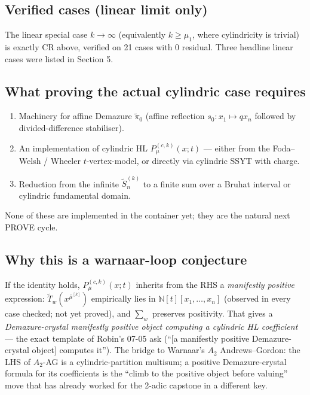 \documentclass[11pt]{article}
\begin{document}
\subsection*{Verified cases (linear limit only)}

The linear special case $k \to \infty$ (equivalently $k \geq \mu_1$, where
cylindricity is trivial) is exactly CR above, verified on 21 cases with
0 residual. Three headline linear cases were listed in Section 5.

\subsection*{What proving the actual cylindric case requires}

\begin{enumerate}
\item Machinery for affine Demazure $\widetilde{\pi}_0$
  (affine reflection $s_0: x_1 \mapsto q x_n$ followed by divided-difference
  stabiliser).
\item An implementation of cylindric HL $P^{(c,k)}_\mu(x; t)$ ---
  either from the Foda--Welsh / Wheeler $t$-vertex-model, or directly via
  cylindric SSYT with charge.
\item Reduction from the infinite $\widetilde{S}_n^{(k)}$ to a finite sum
  over a Bruhat interval or cylindric fundamental domain.
\end{enumerate}
None of these are implemented in the container yet; they are the natural
next PROVE cycle.

\subsection*{Why this is a warnaar-loop conjecture}

If the identity holds, $P^{(c,k)}_\mu(x; t)$ inherits from the RHS a
\emph{manifestly positive} expression: $\widetilde{T}_w(x^{\bar\mu^{[k]}})$
empirically lies in $\mathbb{N}[t][x_1, \ldots, x_n]$ (observed in every
case checked; not yet proved), and $\sum_w$ preserves positivity. That
gives a \emph{Demazure-crystal manifestly positive object computing a
cylindric HL coefficient} --- the exact template of Robin's 07-05 ask
(``[a manifestly positive Demazure-crystal object] computes it''). The
bridge to Warnaar's $A_2$ Andrews--Gordon: the LHS of $A_2$-AG is a
cylindric-partition multisum; a positive Demazure-crystal formula for its
coefficients is the ``climb to the positive object before valuing'' move
that has already worked for the 2-adic capstone in a different key.
\end{document}
